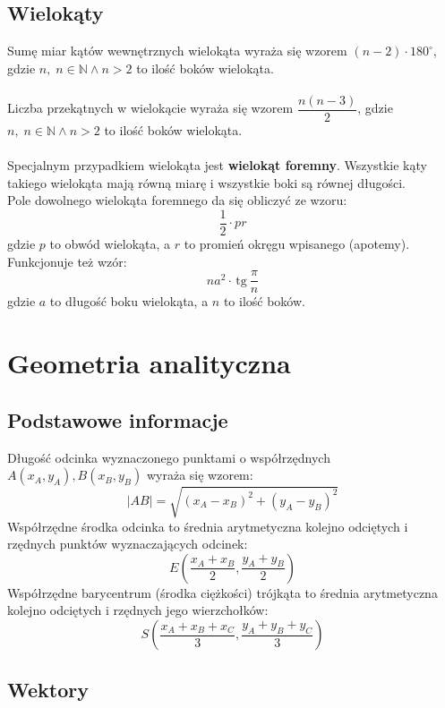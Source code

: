 \documentclass[14pt,a4paper]{extarticle}
\newcommand{\Verts}[1]{\left\lVert#1\right\rVert}
\newcommand{\tg}{\,\text{tg}\:}
\begin{document}
\subsection{Wielokąty}
\noindent Sumę miar kątów wewnętrznych wielokąta wyraża się wzorem $(n - 2)\cdot 180^{\circ}$, gdzie $n,\; n\in \mathbb{N} \land n > 2$
to ilość boków wielokąta.\\\\
\noindent Liczba przekątnych w wielokącie wyraża się wzorem $\dfrac{n(n-3)}{2}$, gdzie $n,\; n\in \mathbb{N} \land n > 2$
to ilość boków wielokąta.\\\\
Specjalnym przypadkiem wielokąta jest \textbf{wielokąt foremny}. Wszystkie kąty takiego wielokąta mają
równą miarę i wszystkie boki są równej długości.\\
Pole dowolnego wielokąta foremnego da się obliczyć ze wzoru:
$$\dfrac{1}{2}\cdot pr$$
gdzie $p$ to obwód wielokąta, a $r$ to promień okręgu wpisanego (apotemy).\\ Funkcjonuje też wzór:
$$na^{2}\cdot\tg\frac{\pi}{n}$$
gdzie $a$ to długość boku wielokąta, a $n$ to ilość boków.

\newpage
\section{Geometria analityczna}

\subsection{Podstawowe informacje}
\MoveBelowBox
{}
\hfill\break
\noindent Długość odcinka wyznaczonego punktami o współrzędnych $A(x_{A}, y_{A}), B(x_{B}, y_{B})$
wyraża się wzorem:
$$\vert AB\vert = \sqrt{(x_{A} - x_{B})^{2}+(y_{A}-y_{B})^{2}}$$
\MoveBelowBox
\noindent Współrzędne środka odcinka to średnia arytmetyczna kolejno odciętych i rzędnych punktów wyznaczających odcinek:
$$E\left(\dfrac{x_{A}+x_{B}}{2}, \dfrac{y_{A}+y_{B}}{2}\right)$$
\noindent Współrzędne barycentrum (środka ciężkości) trójkąta to średnia arytmetyczna kolejno odciętych i
rzędnych jego wierzchołków:
$$S\left(\dfrac{x_{A}+x_{B}+x_{C}}{3}, \dfrac{y_{A}+y_{B}+y_{C}}{3}\right)$$

\subsection{Wektory}
\end{document}
